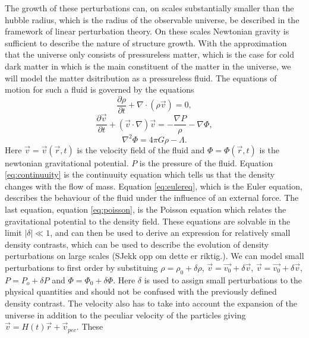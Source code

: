 The growth of these perturbations can, on scales substantially smaller than the
hubble radius, which is the radius of the observable universe, be described in
the framework of linear perturbation theory. On these scales Newtonian gravity
is sufficient to describe the nature of structure growth. With the approximation
that the universe only consists of pressureless matter, which is the case for
cold dark matter in which is the main constituent of the matter in the universe, we
will model the matter dsitribution as a pressureless fluid. The equations of
motion for such a fluid is governed by the equations
\begin{equation}\label{eq:continuuity}
    \frac{\partial \rho}{\partial t} + \nabla\cdot(\rho \vec{v})=0,
\end{equation}
\begin{equation}\label{eq:eulereq}
    \frac{\partial \vec{v}}{\partial t} + (\vec{v}\cdot\nabla)\vec{v}=-\frac{\nabla P}{\rho}-\nabla \Phi,
\end{equation}
\begin{equation}\label{eq:poisson}
    \nabla ^2\Phi=4\pi G\rho -\Lambda.
\end{equation}
Here $\vec{v}=\vec{v}(\vec{r},t)$ is the velocity field of the fluid and $\Phi=\Phi(\vec{r},t)$
is the newtonian gravitational potential. $P$ is the pressure of the fluid. Equation \ref{eq:continuuity} is the
continuuity equation which tells us that the density changes with the flow of
mass. Equation \ref{eq:eulereq}, which is the Euler equation, describes the
behaviour of the fluid under the influence of an external force. The last
equation, equation \ref{eq:poisson}, is the Poisson equation which relates the
gravitational potential to the density field. These equations are solvable in
the limit $\vert\delta\vert \ll 1$, and can then be used to derive an expression
for relatively small density contrasts, which can be used to describe the
evolution of density perturbations on large scales (SJekk opp om dette er
riktig.). We can model small perturbations to first order by substituing $\rho =
\rho_0 + \delta \rho$, $\vec{v} =\vec{v_0} + \delta \vec{v}$, $\vec{v} =\vec{v_0}
+ \delta \vec{v}$, $P = P_o + \delta P$ and $\Phi = \Phi_0 +\delta\Phi$. Here
$\delta$ is used to assign small perturbations to the physical quantities and should not be
confused with the previously defined density contrast. The velocity also has to
take into account the expansion of the universe in addition to the peculiar
velocity of the particles giving $\vec{v} = H(t)\vec{r} + \vec{v}_{pec}$. These
